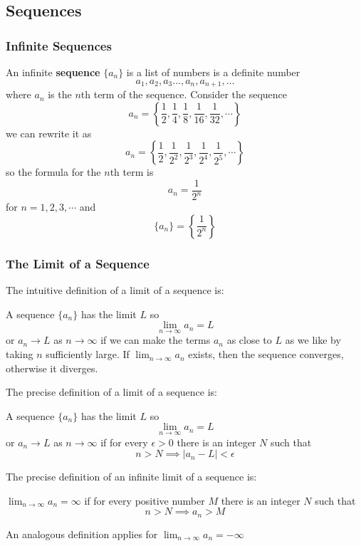 \subsection{Sequences}

\subsubsection*{Infinite Sequences}
An infinite \textbf{sequence} \(\{a_n\}\) is a list of numbers is a definite
number
\[a_1,a_2,a_3\dots,a_n,a_{n+1},\dots\]
where \(a_n\) is the \(n\)th term of the sequence.
Consider the sequence
\[a_n=\left\{\frac{1}{2},\frac{1}{4},\frac{1}{8},\frac{1}{16},\frac{1}{32},
\cdots\right\}\]
we can rewrite it as
\[a_n=\left\{\frac{1}{2},\frac{1}{2^2},\frac{1}{2^3},\frac{1}{2^4},
\frac{1}{2^5},\cdots\right\}\]
so the formula for the \(n\)th term is
\[a_n=\frac{1}{2^n}\]
for \(n=1,2,3,\cdots\) and
\[\{a_n\}=\left\{\frac{1}{2^n}\right\}\]

\subsubsection*{The Limit of a Sequence}
The intuitive definition of a limit of a sequence is:
\begin{definition}
    A sequence \(\{a_n\}\) has the limit \(L\) so
    \[\lim_{n\to\infty}a_n=L\]
    or \(a_n\to L\) as \(n\to\infty\) if we can make the terms \(a_n\) as
    close to \(L\) as we like by taking \(n\) sufficiently large.
    If \(\displaystyle{\lim_{n\to\infty}a_n}\) exists, then the sequence
    converges, otherwise it diverges.
\end{definition}
The precise definition of a limit of a sequence is:
\begin{definition}
    A sequence \(\{a_n\}\) has the limit \(L\) so
    \[\lim_{n\to\infty}a_n=L\]
    or \(a_n\to L\) as \(n\to\infty\) if for every \(\epsilon>0\) there is an
    integer \(N\) such that
    \[n>N\implies |a_n-L|<\epsilon\]
\end{definition}
The precise definition of an infinite limit of a sequence is:
\begin{definition}
    \(\displaystyle{\lim_{n\to\infty}a_n=\infty}\) if for every positive number \(M\) there
    is an integer \(N\) such that
    \[n>N\implies a_n>M\]
\end{definition}
An analogous definition applies for \(\displaystyle{\lim_{n\to\infty}a_n=-\infty}\)

